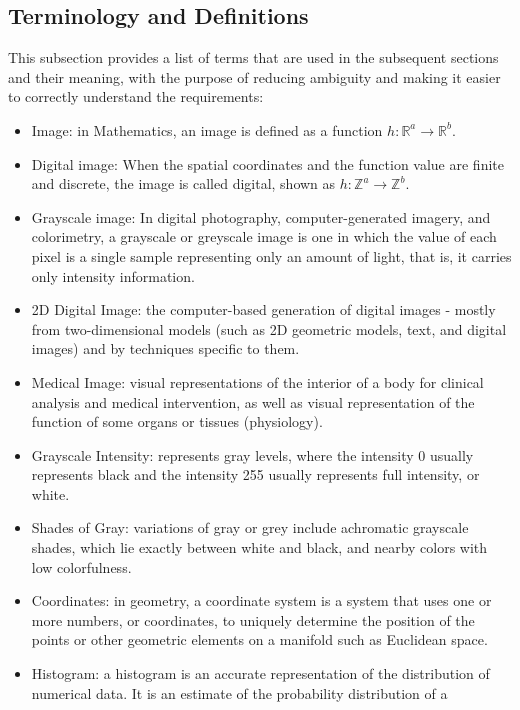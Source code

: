 \documentclass[12pt]{article}
\begin{document}
\subsection{Terminology and  Definitions}

This subsection provides a list of terms that are used in the subsequent
sections and their meaning, with the purpose of reducing ambiguity and making it
easier to correctly understand the requirements:

\begin{itemize}

\item Image: in Mathematics, an image is defined as a function
  $h : \mathbb{R}^{a} \rightarrow \mathbb{R}^{b}$.
\item Digital image: When the spatial coordinates and the function value are
  finite and discrete, the image is called digital, shown as
  $h : \mathbb{Z}^{a} \rightarrow \mathbb{Z}^{b}$.
\item Grayscale image: In digital photography, computer-generated imagery, and
  colorimetry, a grayscale or greyscale image is one in which the value of each
  pixel is a single sample representing only an amount of light, that is, it
  carries only intensity information.
\item 2D Digital Image: the computer-based generation of digital images - mostly
  from two-dimensional models (such as 2D geometric models, text, and digital
  images) and by techniques specific to them.
\item Medical Image: visual representations of the interior of a body for
  clinical analysis and medical intervention, as well as visual representation
  of the function of some organs or tissues (physiology).
\item Grayscale Intensity: represents gray levels, where the intensity 0 usually
  represents black and the intensity 255 usually represents full intensity, or
  white.
\item Shades of Gray: variations of gray or grey include achromatic grayscale
  shades, which lie exactly between white and black, and nearby colors with low
  colorfulness.
\item Coordinates: in geometry, a coordinate system is a system that uses one or
  more numbers, or coordinates, to uniquely determine the position of the points
  or other geometric elements on a manifold such as Euclidean space.
\item Histogram: a histogram is an accurate representation of the distribution
  of numerical data. It is an estimate of the probability distribution of a

\end{itemize}
\end{document}
